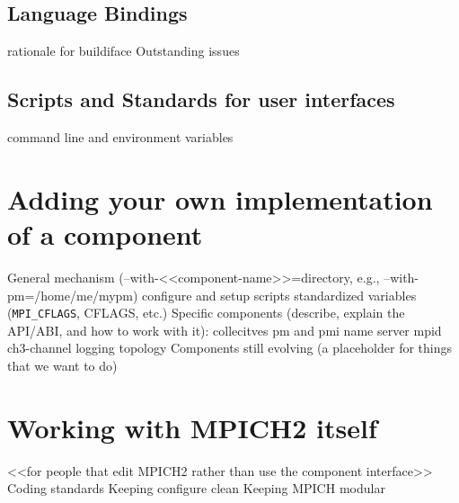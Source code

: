 \documentclass{article}
\begin{document}
\subsection{Language Bindings}
           rationale for buildiface
           Outstanding issues

\subsection{Scripts and Standards for user interfaces}
           command line and environment variables

\section{Adding your own implementation of a component}
         General mechanism (--with-<<component-name>>=directory, e.g., --with-pm=/home/me/mypm)
              configure and setup scripts
              standardized variables (\texttt{MPI\_CFLAGS}, CFLAGS, etc.)
         Specific components (describe, explain the API/ABI, and how to work with it):
             collecitves
             pm and pmi
             name server
             mpid
             ch3-channel
             logging
             topology
          Components still evolving (a placeholder for things that we want to do)

\section{Working with MPICH2 itself}
          <<for people that edit MPICH2 rather than use the component interface>>
          Coding standards
          Keeping configure clean
          Keeping MPICH modular
          
\end{document}
